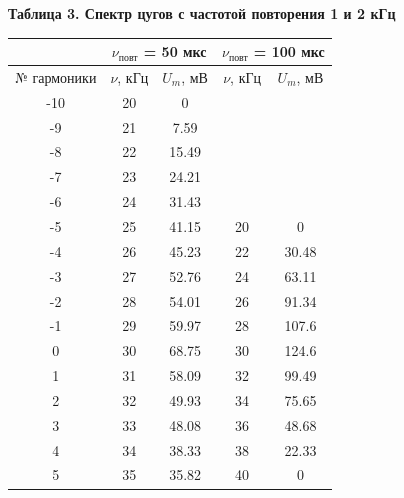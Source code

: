 \documentclass[15pt,a5paper,reqno]{article}
\begin{document}
        \noindent\hypertarget{table_3}{\textbf{Таблица 3. Спектр цугов с частотой повторения 1 и 2 кГц}}
        \begin{center}
            \begin{tabular}{|c|c|c|c|c|}
                 \hline
                             & \multicolumn{2}{|c|}{$\nu_{\text{повт}}$ = 50 мкс} & \multicolumn{2}{|c|}{$\nu_{\text{повт}}$ = 100 мкс} \\ \hline\hline
                 № гармоники &      $\nu$, кГц & $U_m$, мВ           &      $\nu$, кГц & $U_m$, мВ            \\ \hline
                      -10    &              20  & 0                  & &\\ \hline
                       -9    &              21  & 7.59               & &\\ \hline
                       -8    &              22  & 15.49              & &\\ \hline
                       -7    &              23  & 24.21              & &\\ \hline
                       -6    &              24  & 31.43              & &\\ \hline
                       -5    &              25  & 41.15              & 20 & 0 \\ \hline
                       -4    &              26  & 45.23              & 22 & 30.48 \\ \hline
                       -3    &              27  & 52.76              & 24 & 63.11 \\ \hline
                       -2    &              28  & 54.01              & 26 & 91.34 \\ \hline
                       -1    &              29  & 59.97              & 28 & 107.6 \\ \hline
                        0    &             30 & 68.75                & 30 & 124.6 \\ \hline    
                        1    &             31 & 58.09                & 32 & 99.49 \\ \hline
                        2    &             32 & 49.93                & 34 & 75.65 \\ \hline
                        3    &             33 & 48.08                & 36 & 48.68 \\ \hline
                        4    &             34 & 38.33                & 38 & 22.33 \\ \hline
                        5    &             35 & 35.82                & 40 & 0 \\ \hline

\end{tabular}
\end{center}
\end{document}
